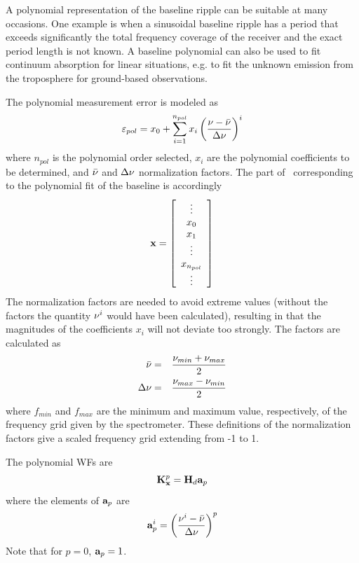  A polynomial representation of the baseline ripple can be suitable
 at many occasions. One example is when a sinusoidal baseline ripple 
 has a period that exceeds significantly the total frequency coverage
 of the receiver and the exact period length is not known. A baseline
 polynomial can also be used to fit continuum absorption for linear
 situations, e.g. to fit the unknown emission from the troposphere
 for ground-based observations.

 The polynomial measurement error is modeled as
 \begin{equation}
   \varepsilon_{pol} = x_0 + \sum_{i=1}^{n_{pol}} x_i \left( 
                      \frac{\nu-\bar{\nu}}{\Delta \nu} \right)^i
 \end{equation}
 where $n_{pol}$ is the polynomial order selected, $x_i$ are the 
 polynomial coefficients to be determined, and $\bar{\nu}$ and
 $\Delta \nu$ normalization factors. The part of \xt\ corresponding
 to the polynomial fit of the baseline is accordingly
 \begin{equation}
   \mathbf{x} = \left[ \begin{array}{c} \vdots \\ x_0\\ x_1 \\ \vdots \\ x_{n_{pol}} \\ \vdots \end{array} \right]
 \end{equation}
 The normalization factors are needed to avoid extreme values (without
 the factors the quantity $\nu^i$ would have been calculated),
 resulting in that the magnitudes of the coefficients $x_i$ will not
 deviate too strongly. The factors are calculated as
 \begin{eqnarray}
   \bar{\nu} &=& \frac{\nu_{min}+\nu_{max}}{2} \\
   \Delta \nu &=& \frac{\nu_{max}-\nu_{min}}{2}
 \end{eqnarray}
 where $f_{min}$ and $f_{max}$ are the minimum and maximum value,
 respectively, of the frequency grid given by the spectrometer. These
 definitions of the normalization factors give a scaled frequency grid
 extending from -1 to 1.

 The polynomial WFs are
 \begin{equation}
   \mathbf{K}_{\mathbf{x}}^p = \mathbf{H}_d \mathbf{a}_p
 \end{equation}
 where the elements of $\mathbf{a}_p$ are
 \begin{equation}
   \mathbf{a}_p^i = \left( \frac{\nu^i-\bar{\nu}}{\Delta \nu} \right)^p
  \label{eq:measerr:kpol}
 \end{equation}
 Note that for $p=0$, $\mathbf{a}_p=1$. 
 
